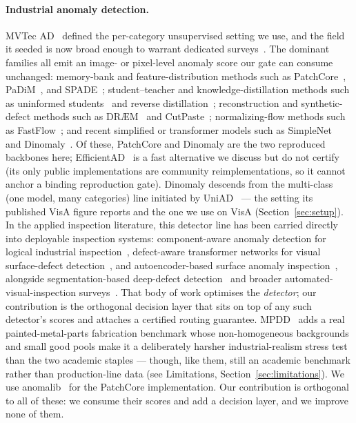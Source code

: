 \documentclass[preprint,11pt]{elsarticle}
\begin{document}
\paragraph{Industrial anomaly detection.} MVTec AD~\citep{bergmann2019mvtec} defined the
per-category unsupervised setting we use, and the field it seeded is now broad enough to warrant
dedicated surveys~\citep{liu2024survey}. The dominant families all emit an image- or pixel-level
anomaly score our gate can consume unchanged: memory-bank and feature-distribution methods such as
PatchCore~\citep{roth2022patchcore}, PaDiM~\citep{defard2021padim}, and
SPADE~\citep{cohen2020spade}; student--teacher and knowledge-distillation methods such as uninformed
students~\citep{bergmann2020uninformed} and reverse distillation~\citep{deng2022reverse};
reconstruction and synthetic-defect methods such as DR{\AE}M~\citep{zavrtanik2021draem} and
CutPaste~\citep{li2021cutpaste}; normalizing-flow methods such as
FastFlow~\citep{yu2021fastflow}; and recent simplified or transformer models such as
SimpleNet~\citep{liu2023simplenet} and Dinomaly~\citep{guo2025dinomaly}. Of these, PatchCore and
Dinomaly are the two reproduced backbones here; EfficientAD~\citep{batzner2024efficientad} is a fast
alternative we discuss but do not certify (its only public implementations are community
reimplementations, so it cannot anchor a binding reproduction gate). Dinomaly descends from the
multi-class (one model, many categories) line initiated by UniAD~\citep{you2022unified} --- the
setting its published VisA figure reports and the one we use on VisA
(Section~\ref{sec:setup}). In the applied inspection literature, this
detector line has been carried directly into deployable inspection systems: component-aware anomaly
detection for logical industrial inspection~\citep{liu2023component}, defect-aware transformer
networks for visual surface-defect detection~\citep{shang2023defect}, and autoencoder-based surface
anomaly inspection~\citep{tsai2021autoencoder}, alongside segmentation-based deep-defect
detection~\citep{tabernik2020segmentation} and broader automated-visual-inspection
surveys~\citep{czimmermann2020visual}. That body of work optimises the \emph{detector}; our
contribution is the orthogonal decision layer that sits on top of any such detector's scores and
attaches a certified routing guarantee. MPDD~\citep{jezek2021mpdd} adds a real painted-metal-parts
fabrication benchmark whose non-homogeneous backgrounds and small good pools make it a deliberately
harsher industrial-realism stress test than the two academic staples --- though, like them, still an
academic benchmark rather than production-line data (see Limitations, Section~\ref{sec:limitations}).
We use
anomalib~\citep{akcay2022anomalib} for the PatchCore implementation. Our contribution is orthogonal
to all of these: we consume their scores and add a decision layer, and we improve none of them.
\end{document}
